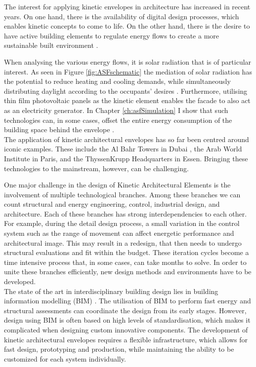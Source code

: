 
The interest for applying kinetic envelopes in architecture has increased in recent years. On one hand, there is the availability of digital design processes, which enables kinetic concepts to come to life. On the other hand, there is the desire to have active building elements to regulate energy flows to create a more sustainable built environment \cite{loonen2013climate}. 

When analysing the various energy flows, it is solar radiation that is of particular interest. As seen in Figure \ref{fig:ASFschematic} the mediation of solar radiation has the potential to reduce heating and cooling demands, while simultaneously distributing daylight according to the occupants' desires \cite{nagy2016adaptive}. Furthermore, utilising thin film photovoltaic panels as the kinetic element enables the facade to also act as an electricity generator. In Chapter \ref{ch:asfSimulation} I show that such technologies can, in some cases, offset the entire energy consumption of the building space behind the envelope \cite{jayathissa2017optimising}. \\

The application of kinetic architectural envelopes has so far been centred around iconic examples. These include the Al Bahr Towers in Dubai \cite{oborn2012bahr}, the Arab World Institute in Paris, and the ThyssenKrupp Headquarters in Essen. Bringing these technologies to the mainstream, however, can be challenging. 

One major challenge in the design of Kinetic Architectural Elements is the involvement of multiple technological branches. Among these branches we can count structural and energy engineering, control, industrial design, and architecture. Each of these branches has strong interdependencies to each other. For example, during the detail design process, a small variation in the control system such as the range of movement can affect energetic performance and architectural image. This may result in a redesign, that then needs to undergo structural evaluations and fit within the budget. These iteration cycles become a time intensive process that, in some cases, can take months to solve. In order to unite these branches efficiently, new design methods and environments have to be developed. \\

The state of the art in interdisciplinary building design lies in building information modelling (BIM) \cite{schlueter2009building, volk2014building}. The utilisation of BIM to perform fast energy and structural assessments can coordinate the design from its early stages. However, design using BIM is often based on high levels of standardisation, which makes it complicated when designing custom innovative components. The development of kinetic architectural envelopes requires a flexible infrastructure, which allows for fast design, prototyping and production, while maintaining the ability to be customized for each system individually. 

